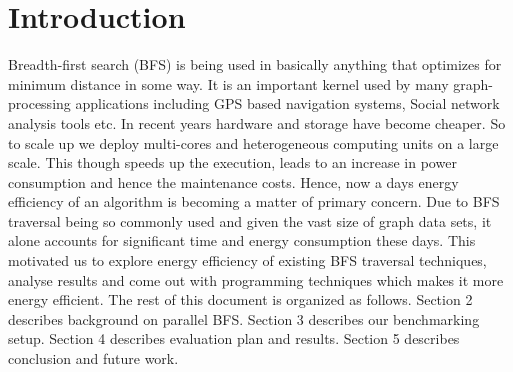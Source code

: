 \section{Introduction}
\label{intro}

Breadth-first search (BFS) is being used in basically anything that
optimizes for minimum distance in some way.  It is an important kernel
used by many graph-processing applications including GPS based
navigation systems, Social network analysis tools etc.\newline
In recent years hardware and storage have become cheaper. So to scale
up we deploy multi-cores and heterogeneous computing units on a large
scale. This though speeds up the execution, leads to an increase in
power consumption and hence the maintenance costs. Hence, now a days
energy efficiency of an algorithm is becoming a matter of primary
concern.
\newline
Due to BFS traversal being so commonly used and given
the vast size of graph data sets, it alone accounts for significant
time and energy consumption these days.  This motivated us to explore
energy efficiency of existing BFS traversal techniques, analyse
results and come out with programming techniques which makes it more
energy efficient.
\newline
The rest of this document is organized as follows.  Section 2
describes background on parallel BFS.  Section 3 describes our
benchmarking setup.  Section 4 describes evaluation plan and results.
Section 5 describes conclusion and future work.

